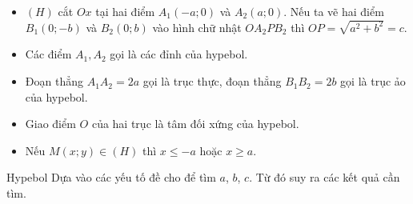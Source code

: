 \begin{note}
	\begin{itemize}
		\item $(H)$ cắt $Ox$ tại hai điểm $A_1(-a; 0)$ và $A_2(a; 0)$. Nếu ta vẽ hai điểm $B_1(0; -b)$ và $B_2(0; b)$ vào hình chữ nhật $OA_2PB_2$ thì $OP=\sqrt{a^2+b^2}=c$.
		\item Các điểm $A_1, A_2$ gọi là các đỉnh của hypebol.
		\item Đoạn thẳng $A_1A_2 = 2a$ gọi là trục thực, đoạn thẳng $B_1B_2 = 2b$ gọi là trục ảo của hypebol.
		\item Giao điểm $O$ của hai trục là tâm đối xứng của hypebol.
		\item  Nếu $M(x; y) \in (H)$ thì $x \leq -a$  hoặc  $x \geq a$.
	\end{itemize} 
\end{note}

\begin{dang}{Hypebol}
	Dựa vào các yếu tố đề cho để tìm $a$, $b$, $c$. Từ đó suy ra các kết quả cần tìm.
\end{dang}
